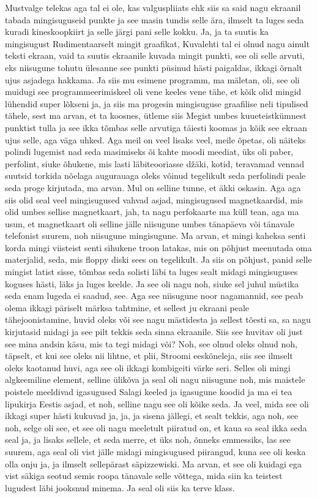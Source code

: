 Mustvalge telekas aga tal ei ole, kas valguspliiats ehk siis sa said nagu ekraanil tabada mingisuguseid punkte ja see masin tundis selle ära, ilmselt ta luges seda kuradi kineskoopkiirt ja selle järgi pani selle kokku. Ja, ja ta suutis ka mingisugust Rudimentaarselt mingit graafikat, Kuvalehti tal ei olnud nagu ainult teksti ekraan, vaid ta suutis ekraanile kuvada mingit punkti, see oli selle arvuti, eks niisugune tohutu ülesanne see punkti püsinud hästi paigaldas, ikkagi õrnalt ujus asjadega hakkama. Ja siis mu esimene programm, ma mäletan, oli, see oli muidugi see programmeerimiskeel oli vene keeles vene tähe, et kõik olid mingid lühendid super lõkseni ja, ja siis ma progesin mingisuguse graafilise neli tipulised tähele, sest ma arvan, et ta koosnes, ütleme siis Megist umbes kuueteistkümnest punktist tulla ja see ikka tõmbas selle arvutiga täiesti koomas ja kõik see ekraan ujus selle, aga väga uhked. Aga meil on veel lisaks veel, meile õpetas, oli näiteks polindi lugemist nad seda masimiseks õi kahte moodi meediat, üks oli paber, perfolint, siuke õhukene, mis lasti läbiteooriasse džäki, kotid, teravamad vennad suutsid torkida nõelaga augurauaga oleks võinud tegelikult seda perfolindi peale seda proge kirjutada, ma arvan.
Mul on selline tunne, et äkki oskasin.
Aga aga siis olid seal veel mingisugused vahvad asjad, mingisugused magnetkaardid, mis olid umbes sellise magnetkaart, jah, ta nagu perfokaarte ma küll tean, aga ma usun, et magnetkaart oli selline jälle niisugune umbes tänapäeva või tänavale telefonist suurem, noh niisugune mingisugune. Ma arvan, et mingi kaheksa senti korda mingi viisteist senti sihukene troon latakas, mis on põhjust meenutada oma materjalid, seda, mis floppy diski sees on tegelikult. Ja siis on põhjust, panid selle mingist latist sisse, tõmbas seda solisti läbi ta luges sealt midagi mingisuguses koguses hästi, läks ja luges keelde. Ja see oli nagu noh, siuke sel juhul müstika seda enam lugeda ei saadud, see. Aga see niisugune noor nagamannid, see peab olema ikkagi päriselt märksa tahtmine, et sellest ju ekraani peale tähejoonistamine, huvid oleks või see nagu mästidesta ja sellest tõesti sa, sa nagu kirjutasid midagi ja see pilt tekkis seda sinna ekraanile. Siis see huvitav oli just see mina andsin käsu, mis ta tegi midagi või? Noh, see olnud oleks olnud noh, täpselt, et kui see oleks nii lihtne, et plii, Stroomi eeskõneleja, siis see ilmselt oleks kaotanud huvi, aga see oli ikkagi kombigeiti värke seri. Selles oli mingi algkeemiline element, selline ülikõva ja seal oli nagu niisugune noh, mis maistele poistele meeldivad igasugused Salagi keeled ja igasugune koodid ja ma ei tea lipukirja Eestis asjad, et noh, selline nagu see oli kõike seda. Ja veel, mida see oli ikkagi super hästi kukuvad ja, ja, ja sisena jällegi, et sealt tekkis, aga noh, see noh, selge oli see, et see oli nagu meeletult piiratud on, et kaua sa seal ikka seda seal ja, ja lisaks sellele, et seda merre, et üks noh, õnneks emmessiks, las see suurem, aga seal oli vist jälle midagi mingisugused piirangud, kuna see oli keska olla onju ja, ja ilmselt sellepärast säpizzewiski. Ma arvan, et see oli kuidagi ega vist säkiga seotud semis roopa tänavale selle võttega, mida siin ka teistest lugudest läbi jooksnud minema. Ja seal oli siis ka terve klass.
